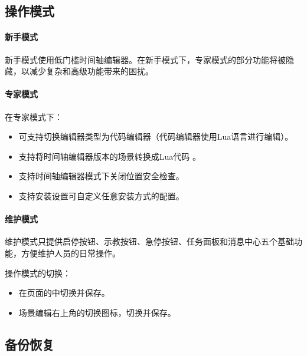 



\subsection{操作模式}

\paragraph{新手模式}
新手模式使用低门槛时间轴编辑器。在新手模式下，专家模式的部分功能将被隐藏，以减少复杂和高级功能带来的困扰。
\paragraph{专家模式}
在专家模式下：
\begin{itemize}
\item 可支持切换编辑器类型为代码编辑器（代码编辑器使用Lua语言进行编辑）。
\item 支持将时间轴编辑器版本的场景转换成Lua代码 。
\item 支持时间轴编辑器模式下关闭位置安全检查。
\item 支持安装设置可自定义任意安装方式的配置。
\end{itemize}


\paragraph{维护模式}
维护模式只提供启停按钮、示教按钮、急停按钮、任务面板和消息中心五个基础功能，方便维护人员的日常操作。


操作模式的切换：
\begin{itemize}
	\item 在页面的中切换并保存。
	\item 场景编辑右上角的切换图标，切换并保存。
\end{itemize}

\subsection{备份恢复}

